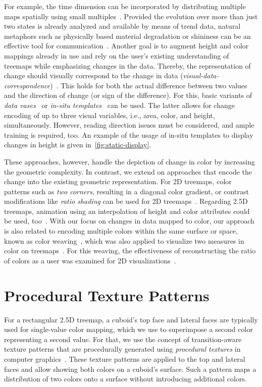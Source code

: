 \documentclass[smallextended,natbib]{svjour3}       %
\begin{document}
For example, the time dimension can be incorporated by distributing multiple maps spatially using small multiples~\citep{scheibel2016-smallmultiples,chen2017-pesticide}.
Provided the evolution over more than just two states is already analyzed and available by means of trend data, natural metaphors such as physically based material degradation or shininess can be an effective tool for communication~\citep{wurfel2016-naturalphenomena}.
Another goal is to augment height and color mappings already in use and rely on the user's existing understanding of treemaps while emphasizing changes in the data.
Thereby, the representation of change should visually correspond to the change in data (\emph{visual-data-correspondence})~\citep{kindlmann2014-algebraic}.
This holds for both the actual difference between two values and the direction of change (or sign of the difference).
For this, basic variants of \emph{data vases}~\citep{thakur2009-datavases} or \emph{in-situ templates}~\citep{limberger2019-insitu} can be used.
The latter allows for change encoding of up to three visual variables, i.e., area, color, and height, simultaneously.
However, reading direction issues must be considered, and ample training is required, too.
An example of the usage of in-situ templates to display changes in height is given in~\autoref{fig:static-display}.

These approaches, however, handle the depiction of change in color by increasing the geometric complexity.
In contrast, we extend on approaches that encode the change into the existing geometric representation.
For 2D treemaps, color patterns such as \emph{two corners}, resulting in a diagonal color gradient, or contrast modifications like \emph{ratio shading} can be used for 2D treemaps~\citep{tu2007-changes}.
Regarding 2.5D treemaps, animation using an interpolation of height and color attributes could be used, too~\citep{bladh2005-transitions,langelier2008-evolution}.
With our focus on changes in data mapped to color, our approach is also related to encoding multiple colors within the same surface or space, known as color weaving~\citep{urness2003-multi-valued}, which was also applied to visualize two measures in color on treemaps~\citep{benomar2013-dynamicities}.
For this weaving, the effectiveness of reconstructing the ratio of colors as a user was examined for 2D visualizations~\citep{haghshenas2007-weaving}.

\section{Procedural Texture Patterns}
For a rectangular 2.5D treemap, a cuboid's top face and lateral faces are typically used for single-value color mapping, which we use to superimpose a second color representing a second value.
For that, we use the concept of transition-aware texture patterns that are procedurally generated using \emph{procedural textures} in computer graphics~\citep{Quilez13}.
These texture patterns are applied to the top and lateral faces and allow showing both colors on a cuboid's surface.
Such a pattern maps a distribution of two colors onto a surface without introducing additional colors.
\end{document}
